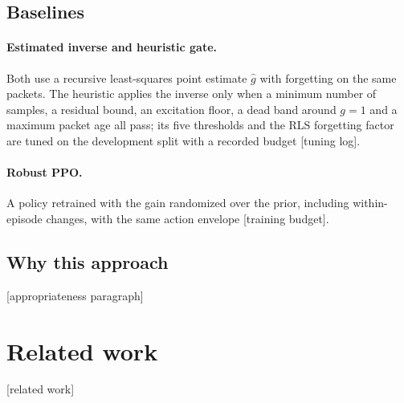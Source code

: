 \documentclass[10pt,twocolumn]{article}
\newcommand{\todo}[1]{\textcolor{red!70!black}{[#1]}}
\begin{document}
\subsection{Baselines}
\paragraph{Estimated inverse and heuristic gate.} Both use a recursive least-squares point
estimate $\hat g$ with forgetting on the same packets. The heuristic applies the inverse only
when a minimum number of samples, a residual bound, an excitation floor, a dead band around
$g=1$ and a maximum packet age all pass; its five thresholds and the RLS forgetting factor are
tuned on the development split with a recorded budget \todo{tuning log}.
\paragraph{Robust PPO.} A policy retrained with the gain randomized over the prior, including
within-episode changes, with the same action envelope \todo{training budget}.

\subsection{Why this approach}
\todo{appropriateness paragraph}

\section{Related work}
\todo{related work}
\end{document}
